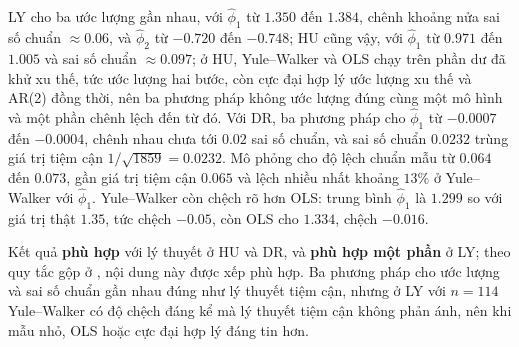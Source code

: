  LY cho ba ước lượng gần nhau, với $\hat\phi_1$ từ $1.350$ đến $1.384$, chênh khoảng nửa sai số chuẩn $\approx0.06$, và $\hat\phi_2$ từ $-0.720$ đến $-0.748$; HU cũng vậy, với $\hat\phi_1$ từ $0.971$ đến $1.005$ và sai số chuẩn $\approx0.097$; ở HU, Yule--Walker và OLS chạy trên phần dư đã khử xu thế, tức ước lượng hai bước, còn cực đại hợp lý ước lượng xu thế và AR(2) đồng thời, nên ba phương pháp không ước lượng đúng cùng một mô hình và một phần chênh lệch đến từ đó. Với DR, ba phương pháp cho $\hat\phi_1$ từ $-0.0007$ đến $-0.0004$, chênh nhau chưa tới $0.02$ sai số chuẩn, và sai số chuẩn $0.0232$ trùng giá trị tiệm cận $1/\sqrt{1859}=0.0232$. Mô phỏng cho độ lệch chuẩn mẫu từ $0.064$ đến $0.073$, gần giá trị tiệm cận $0.065$ và lệch nhiều nhất khoảng $13\%$ ở Yule--Walker với $\hat\phi_1$. Yule--Walker còn chệch rõ hơn OLS: trung bình $\hat\phi_1$ là $1.299$ so với giá trị thật $1.35$, tức chệch $-0.05$, còn OLS cho $1.334$, chệch $-0.016$.

 Kết quả \textbf{phù hợp} với lý thuyết ở HU và DR, và \textbf{phù hợp một phần} ở LY; theo quy tắc gộp ở , nội dung này được xếp phù hợp. Ba phương pháp cho ước lượng và sai số chuẩn gần nhau đúng như lý thuyết tiệm cận, nhưng ở LY với $n=114$ Yule--Walker có độ chệch đáng kể mà lý thuyết tiệm cận không phản ánh, nên khi mẫu nhỏ, OLS hoặc cực đại hợp lý đáng tin hơn.

